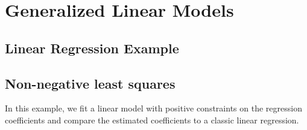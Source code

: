 \chapter{Generalized Linear Models}
\section{Linear Regression Example\label{Linear Regression Example}}
\section{Non-negative least squares\label{Non-negative least squares}}
In this example, we fit a linear model with positive constraints on the regression coefficients and compare the estimated coefficients to a classic linear regression.
